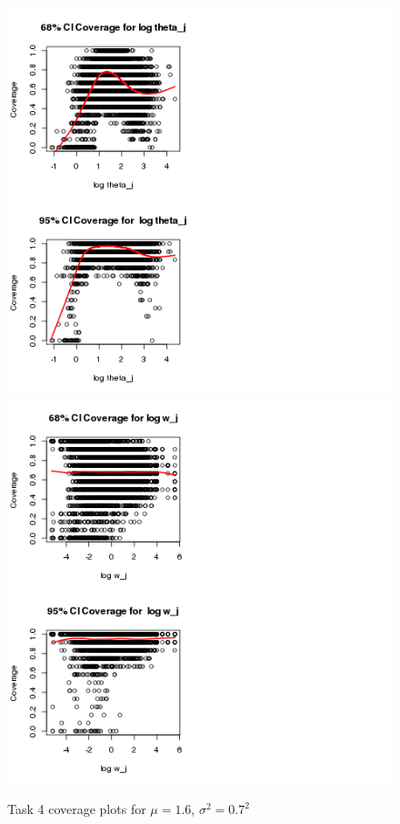 \documentclass[paper=a4, fontsize=11pt]{scrartcl}
\begin{document}
\begin{figure}[h!]
  \caption{Task 4 coverage plots for $\mu = 1.6$, $\sigma^2 = 0.7^2$}
  \centering
	\includegraphics[scale=1, trim = 80 0 150 0]{keskici_wxiao_ps2_task4_plot1.png}
		\includegraphics[scale=1, trim = 100 0 300 0]{keskici_wxiao_ps2_task4_plot2.png}
\end{figure}
\end{document}
